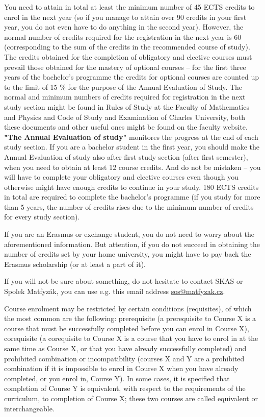 You need to attain in total at least the minimum number of 45 ECTS credits to
enrol in the next year (so if you manage to attain over 90 credits in your first
year, you do not even have to do anything in the second year). However, the
normal number of credits required for the registration in the next year is 60
(corresponding to the sum of the credits in the recommended course of study).
The credits obtained for the completion of obligatory and elective courses must
prevail those obtained for the mastery of optional courses -- for the first
three years of the bachelor's programme the credits for optional courses are
counted up to the limit of 15 \% for the purpose of the Annual Evaluation of
Study.
The normal and minimum numbers of credits required for registration in the next
study section might be found in Rules of Study at the Faculty of Mathematics and
Physics and Code of Study and Examination of Charles University, both these
documents and other useful ones might be found on the faculty website.
\textbf{"The Annual Evaluation of study"} monitores the progress at the end of
each study section. If you are a bachelor student in the first year, you should
make the Annual Evaluation of study also after first study section (after first
semester), when you need to obtain at least 12 course credits.
And do not be mistaken -- you will have to complete your obligatory and elective
courses even though you otherwise might have enough credits to continue in your
study.
180 ECTS credits in total are required to complete the bachelor's programme (if
you study for more than 5 years, the number of credits rises due to the minimum
number of credits for every study section).

If you are an Erasmus or exchange student, you do not need to worry about the
aforementioned information. But attention, if you do not succeed in obtaining
the number of credits set by your home university, you might have to pay back
the Erasmus scholarship (or at least a part of it).

If you will not be sure about something, do not hesitate to contact SKAS or
Spolek Matfyzák, you can use e.g. this email address \url{sos@matfyzak.cz}.

Course enrolment may be restricted by certain conditions (requisites), of which
the most common are the following: prerequisite (a prerequisite to Course X is a
course that must be successfully completed before you can enrol in Course X),
corequisite (a corequisite to Course X is a course that you have to enrol in at
the same time as Course X, or that you have already successfully completed) and
prohibited combination or incompatibility (courses X and Y are a prohibited
combination if it is impossible to enrol in Course X when you have already
completed, or you enrol in, Course Y).
In some cases, it is specified that completion of Course Y is equivalent, with
respect to the requirements of the curriculum, to completion of Course X; these
two courses are called equivalent or interchangeable.

